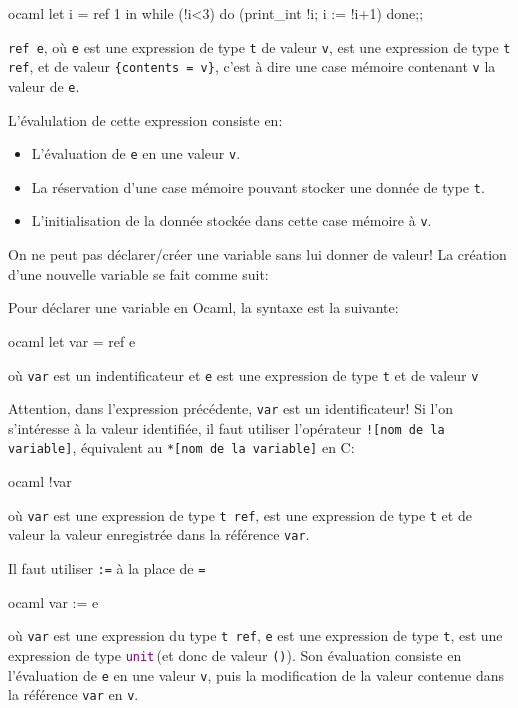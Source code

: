 \documentclass{scrartcl}
\newcommand{\unit}{\textcolor{purple}{\texttt{unit}}\,}
\begin{document}
		\exemple 
		\begin{code}{ocaml}
			let i = ref 1 in while (!i<3) do (print_int !i; i := !i+1) done;;
		\end{code}

		\verb|ref e|, où \verb|e| est une expression de type \verb|t| de valeur \verb|v|, est une expression de type \verb|t ref|,
		et de valeur \verb|{contents = v}|, c'est à dire une case mémoire contenant \verb|v| la valeur de \verb|e|.

		L'évalulation de cette expression consiste en:
		\begin{itemize}
			\item L'évaluation de \verb|e| en une valeur \verb|v|.
			\item La réservation d'une case mémoire pouvant stocker une donnée de type \verb|t|.
			\item L'initialisation de la donnée stockée dans cette case mémoire à \verb|v|.
		\end{itemize}

		\rem On ne peut pas déclarer/créer une variable sans lui donner de valeur! La création d'une nouvelle variable se fait comme suit:
		
		 Pour déclarer une variable en Ocaml, la syntaxe est la suivante:
		\begin{code}{ocaml}
			let var = ref e
		\end{code}
		où \verb|var| est un indentificateur et \verb|e| est une expression de type \verb|t| et de valeur \verb|v|

		 Attention, dans l'expression précédente, \verb|var| est un identificateur! Si l'on s'intéresse
		à la valeur identifiée, il faut utiliser l'opérateur \texttt{![nom de la variable]}, équivalent au \texttt{*[nom de la variable]} en C:
		\begin{code}{ocaml}
			!var
		\end{code}
		où \verb|var| est une expression de type \verb|t ref|, est une expression de type \verb|t| et de valeur la valeur enregistrée dans la référence \verb|var|.

		 Il faut utiliser \texttt{:=} à la place de \texttt{=}
		\begin{code}{ocaml}
			var := e
		\end{code}
		où \verb|var| est une expression du type \verb|t ref|, \verb|e| est une expression de type \verb|t|, est une expression de type \unit (et donc de valeur \verb|()|).
		Son évaluation consiste en l'évaluation de \verb|e| en une valeur \verb|v|,
		puis la modification de la valeur contenue dans la référence \verb|var| en \verb|v|. 
\end{document}
